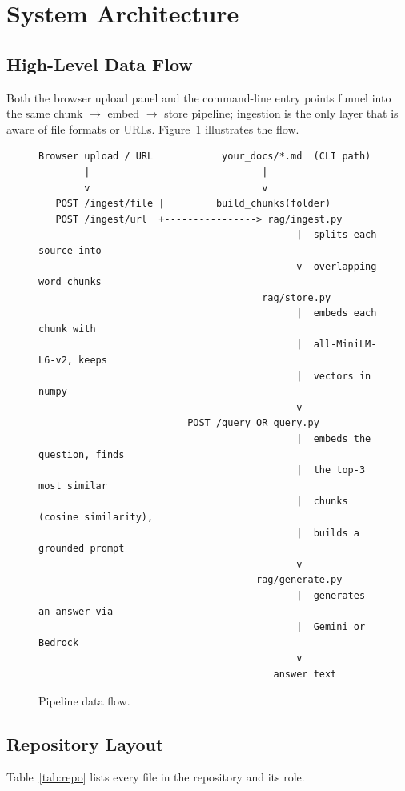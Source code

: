 \documentclass[11pt,a4paper]{article}
\begin{document}
\section{System Architecture}

\subsection{High-Level Data Flow}
Both the browser upload panel and the command-line entry points funnel into
the same chunk $\rightarrow$ embed $\rightarrow$ store pipeline; ingestion is
the only layer that is aware of file formats or URLs. Figure~\ref{fig:pipeline}
illustrates the flow.

\begin{figure}[h]
\centering
\begin{Verbatim}[frame=single, fontsize=\small, numbers=none]
 Browser upload / URL            your_docs/*.md  (CLI path)
        |                              |
        v                              v
   POST /ingest/file |         build_chunks(folder)
   POST /ingest/url  +----------------> rag/ingest.py
                                             |  splits each source into
                                             v  overlapping word chunks
                                       rag/store.py
                                             |  embeds each chunk with
                                             |  all-MiniLM-L6-v2, keeps
                                             |  vectors in numpy
                                             v
                          POST /query OR query.py
                                             |  embeds the question, finds
                                             |  the top-3 most similar
                                             |  chunks (cosine similarity),
                                             |  builds a grounded prompt
                                             v
                                      rag/generate.py
                                             |  generates an answer via
                                             |  Gemini or Bedrock
                                             v
                                         answer text
\end{Verbatim}
\caption{Pipeline data flow.}
\label{fig:pipeline}
\end{figure}

\subsection{Repository Layout}
Table~\ref{tab:repo} lists every file in the repository and its role.
\end{document}
